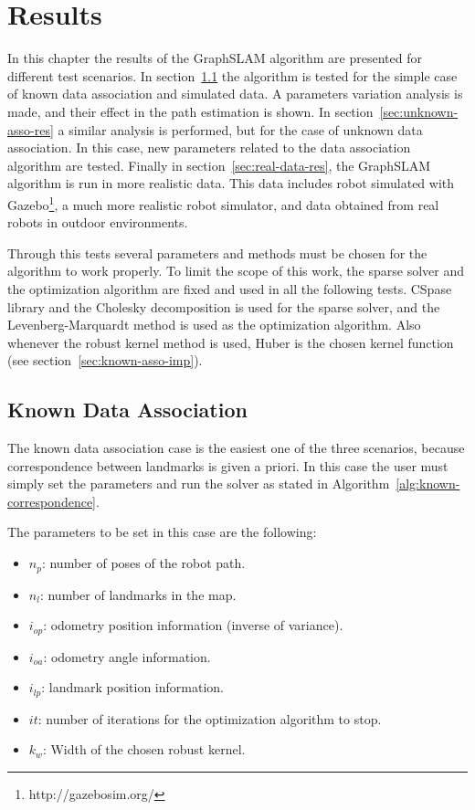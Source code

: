 \chapter{Results}
\label{chap:results}

In this chapter the results of the GraphSLAM algorithm are presented for different test scenarios. In section~\ref{sec:known-asso-res} the algorithm is tested for the simple case of known data association and simulated data. A parameters variation analysis is made, and their effect in the path estimation is shown. In section~\ref{sec:unknown-asso-res} a similar analysis is performed, but for the case of unknown data association. In this case, new parameters related to the data association algorithm are tested. Finally in section~\ref{sec:real-data-res}, the GraphSLAM algorithm is run in more realistic data. This data includes robot simulated with Gazebo\footnote{http://gazebosim.org/}, a much more realistic robot simulator, and data obtained from real robots in outdoor environments. 

Through this tests several parameters and methods must be chosen for the algorithm to work properly. To limit the scope of this work, the sparse solver and the optimization algorithm are fixed and used in all the following tests. CSpase library and the Cholesky decomposition is used for the sparse solver, and the Levenberg-Marquardt method is used as the optimization algorithm. Also whenever the robust kernel method is used, Huber is the chosen kernel function (see section~\ref{sec:known-asso-imp}). 

\section{Known Data Association}
\label{sec:known-asso-res}

The known data association case is the easiest one of the three scenarios, because correspondence between landmarks is given a priori. In this case the user must simply set the parameters and run the solver as stated in Algorithm~\ref{alg:known-correspondence}. 

The parameters to be set in this case are the following:

\begin{itemize}
    \item $n_p$: number of poses of the robot path.
    \item $n_l$: number of landmarks in the map.
    \item $i_{op}$: odometry position information (inverse of variance).
    \item $i_{oa}$: odometry angle information.
    \item $i_{lp}$: landmark position information.
    \item $it$: number of iterations for the optimization algorithm to stop.
    \item $k_w$: Width of the chosen robust kernel.
\end{itemize}


